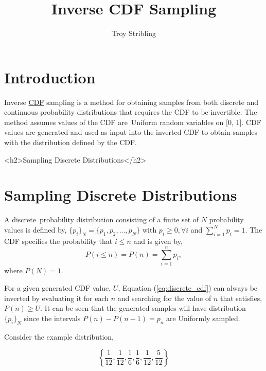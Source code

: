 \documentclass[12pt]{article}
\title{Inverse CDF Sampling}
\author{Troy Stribling}
\begin{document}
\iftex
\maketitle
\section{Introduction}
\fi

Inverse \href{https://en.wikipedia.org/wiki/Cumulative_distribution_function}{CDF} sampling is a method for obtaining samples
from both discrete and continuous probability distributions
that requires the CDF to be invertible. The method assumes values of the CDF are Uniform random variables on [0, 1].
CDF values are generated and used as input into the inverted CDF to obtain samples with the distribution defined by the CDF.

\ifblog
<h2>Sampling Discrete Distributions</h2>
\fi
\iftex
\section{Sampling Discrete Distributions}
\fi

A discrete probability distribution consisting of a finite set of $N$ probability values is defined by,
$\{p_i\}_N = \{p_1, p_2,\ldots,p_N\}$ with $p_i \geq 0, \forall i$ and $\sum_{i=1}^N{p_i} = 1.$ The CDF specifies the probability
that $i \leq n$ and is given by,
\begin{equation}
\label{eq:discrete_cdf}
P(i \leq n)=P(n)=\sum_{i=1}^n{p_i},
\end{equation}
where $P(N)=1.$

For a given generated CDF value, $U$, Equation (\ref{eq:discrete_cdf}) can always be inverted by evaluating it for each $n$ and
searching for the value of $n$ that satisfies, $P(n) \geq U.$ It can be seen that the generated samples will have
distribution $\{p_i\}_N$ since the intervals $P(n)-P(n-1) = p_n$ are Uniformly sampled.

Consider the example distribution,

\begin{equation} 
\left\{\frac{1}{12}, \frac{1}{12}, \frac{1}{6}, \frac{1}{6}, \frac{1}{12}, \frac{5}{12} \right\}
\label{eq:discrete}
\end{equation}
\end{document}
